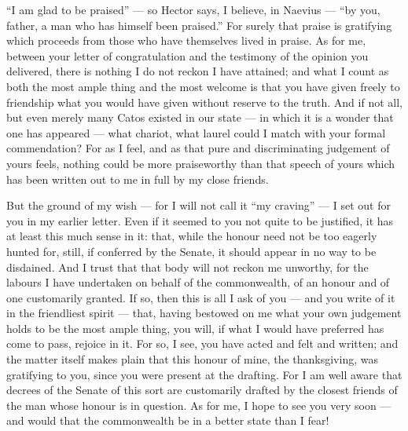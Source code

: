 

 ``I am glad to be praised'' --- so Hector says, I believe, in Naevius --- ``by you, father, a man who has himself been praised.'' For surely that praise is gratifying which proceeds from those who have themselves lived in praise. As for me, between your letter of congratulation and the testimony of the opinion you delivered, there is nothing I do not reckon I have attained; and what I count as both the most ample thing and the most welcome is that you have given freely to friendship what you would have given without reserve to the truth. And if not all, but even merely many Catos existed in our state --- in which it is a wonder that one has appeared --- what chariot, what laurel could I match with your formal commendation? For as I feel, and as that pure and discriminating judgement of yours feels, nothing could be more praiseworthy than that speech of yours which has been written out to me in full by my close friends.

 But the ground of my wish --- for I will not call it ``my craving'' --- I set out for you in my earlier letter. Even if it seemed to you not quite to be justified, it has at least this much sense in it: that, while the honour need not be too eagerly hunted for, still, if conferred by the Senate, it should appear in no way to be disdained. And I trust that that body will not reckon me unworthy, for the labours I have undertaken on behalf of the commonwealth, of an honour and of one customarily granted. If so, then this is all I ask of you --- and you write of it in the friendliest spirit --- that, having bestowed on me what your own judgement holds to be the most ample thing, you will, if what I would have preferred has come to pass, rejoice in it. For so, I see, you have acted and felt and written; and the matter itself makes plain that this honour of mine, the thanksgiving, was gratifying to you, since you were present at the drafting. For I am well aware that decrees of the Senate of this sort are customarily drafted by the closest friends of the man whose honour is in question. As for me, I hope to see you very soon --- and would that the commonwealth be in a better state than I fear!
